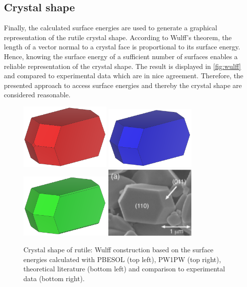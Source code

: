 \documentclass[a4paper,12pt]{scrartcl}
\begin{document}
\subsection{Crystal shape}
%
Finally, the calculated surface energies are used to generate a graphical representation of the rutile crystal shape. According to Wulff's theorem, the length
of a vector normal to a crystal face is proportional to its surface energy. Hence, knowing the surface energy of a sufficient number of surfaces enables a reliable representation of the crystal shape. The result is displayed in \autoref{fig:wulff} and compared to experimental data which are in nice agreement. Therefore, the presented approach to access surface energies and thereby the crystal shape are considered reasonable.
%
\begin{figure}[H]
	\centering
	\includegraphics[width=0.4\textwidth]{wulff_pbesol.png}
	\includegraphics[width=0.4\textwidth]{wulff_pw1pw.png}
	\includegraphics[width=0.4\textwidth]{wulff_theo_lit.png}
	\includegraphics[width=0.4\textwidth]{rutile_exp.png}
	\caption{Crystal shape of rutile: Wulff construction based on the surface energies calculated with PBESOL (top left), PW1PW (top right), theoretical literature\autocite[]{rutile-surface-energy} (bottom left) and comparison to experimental data\autocite[]{rutile-shape} (bottom right).}
	\label{fig:wulff}
\end{figure}
%
\newpage
\printbibliography[title={Literature}]
%
\end{document}
